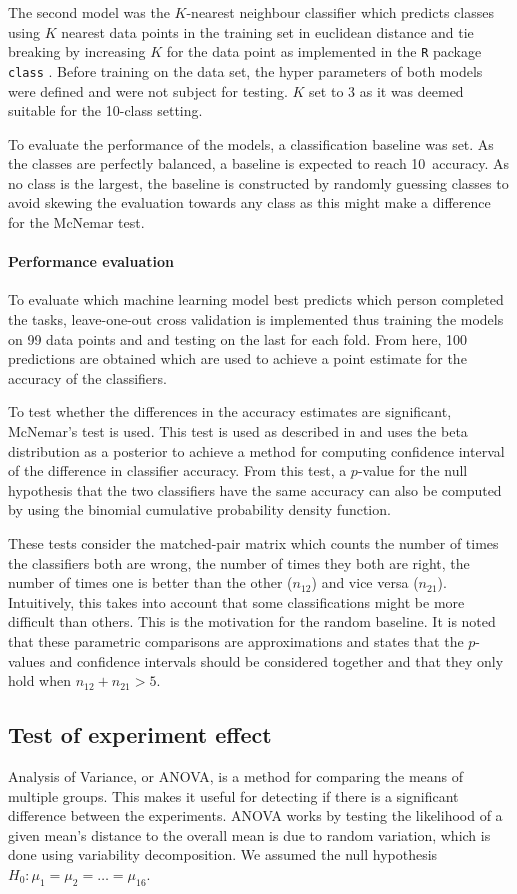 \documentclass[11pt,fleqn]{article}
\begin{document}
The second model was the \(K\)-nearest neighbour classifier which predicts classes using \(K\) nearest data points in the training set in euclidean distance and tie breaking by increasing \(K\) for the data point as implemented in the \texttt{R} package \texttt{class} \cite{KNN}. Before training on the data set, the hyper parameters of both models were defined and were not subject for testing. \(K\) set to 3 as it was deemed suitable for the 10-class setting.

To evaluate the performance of the models, a classification baseline was set. As the classes are perfectly balanced, a baseline is expected to reach 10\pro\ accuracy. As no class is the largest, the baseline is constructed by randomly guessing classes to avoid skewing the evaluation towards any class as this might make a difference for the McNemar test.
\paragraph{Performance evaluation}
To evaluate which machine learning model best predicts which person completed the tasks, leave-one-out cross validation is implemented thus training the models on 99 data points and and testing on the last for each fold.
From here, 100 predictions are obtained which are used to achieve a point estimate for the accuracy of the classifiers.

To test whether the differences in the accuracy estimates are significant, McNemar's test is used. 
This test is used as described in \cite[Method 11.3.2]{Tue} and uses the beta distribution as a posterior to achieve a method for computing confidence interval of the difference in classifier accuracy.
From this test, a \(p\)-value for the null hypothesis that the two classifiers have the same accuracy can also be computed by using the binomial cumulative probability density function.

These tests consider the matched-pair matrix which counts the number of times the classifiers both are wrong, the number of times they both are right, the number of times one is better than the other (\(n_{12}\)) and vice versa (\(n_{21}\)).
Intuitively, this takes into account that some classifications might be more difficult than others. 
This is the motivation for the random baseline. It is noted that these parametric comparisons are approximations and \cite{Tue} states that the \(p\)-values and confidence intervals should be considered together and that they only hold when \(n_{12}+n_{21}> 5\).
\subsection{Test of experiment effect}\label{subsec:expeffect}
Analysis of Variance, or ANOVA, is a method for comparing the means of multiple groups.
This makes it useful for detecting if there is a significant difference between the experiments.
ANOVA works by testing the likelihood of a given mean's distance to the overall mean is due to random variation, which is done using variability decomposition.
We assumed the null hypothesis $ H_0: \mu_1=\mu_2=\ldots=\mu_{16} $.
\end{document}
